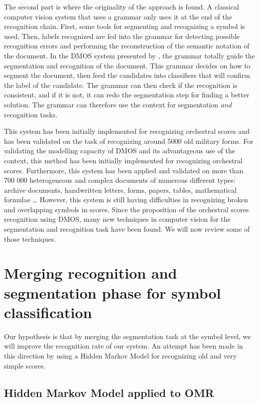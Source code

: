 \documentclass[11pt]{sdm}
\begin{document}
The second part is where the originality of the approach is found.
A classical computer vision system that uses a grammar only uses it at the end of the recognition chain.
First, some tools for segmenting and recognizing a symbol is used.
Then, labels recognized are fed into the grammar for detecting possible recognition errors and performing the reconstruction of the semantic notation of the document.
In the DMOS system presented by \cite{couasnon_dmos_2001}, the grammar totally guide the segmentation and recognition of the document.
This grammar decides on how to segment the document, then feed the candidates into classifiers that will confirm the label of the candidate.
The grammar can then check if the recognition is consistent, and if it is not, it can redo the segmentation step for finding a better solution.
The grammar can therefore use the context for segmentation \textit{and} recognition tasks.

This system has been initially implemented for recognizing orchestral scores and has been validated on the task of recognizing around 5000 old military forms.
For validating the modelling capacity of DMOS and its advantageous use of the context, this method has been initially implemented for recognizing orchestral scores.
Furthermore, this system has been applied and validated on more than 700 000 heterogeneous and complex documents of numerous different types: archive documents, handwritten letters, forms, papers, tables, mathematical formulae \ldots
However, this system is still having difficulties in recognizing broken and overlapping symbols in scores.
Since the proposition of the orchestral scores recognition using DMOS, many new techniques in computer vision for the segmentation and recognition task have been found.
We will now review some of those techniques.

\section{Merging recognition and segmentation phase for symbol classification} \label{sec:merge}

Our hypothesis is that by merging the segmentation task at the symbol level, we will improve the recognition rate of our system.
An attempt has been made in this direction by using a Hidden Markov Model for recognizing old and very simple scores.

\subsection{Hidden Markov Model applied to OMR} \label{ssec:HMM}
\end{document}
